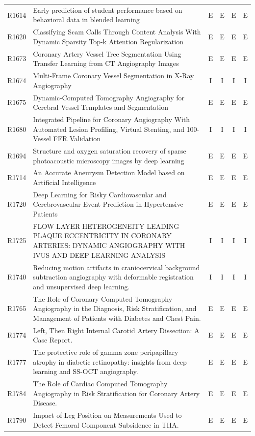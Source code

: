 \begin{longtable}{@{}l p{8.6cm} c c c c@{}}
R1614 & Early prediction of student performance based on behavioral data in blended learning & E & E & E & E \\
R1620 & Classifying Scam Calls Through Content Analysis With Dynamic Sparsity Top-k Attention Regularization & E & E & E & E \\
R1673 & Coronary Artery Vessel Tree Segmentation Using Transfer Learning from CT Angiography Images & E & E & E & E \\
R1674 & Multi-Frame Coronary Vessel Segmentation in X-Ray Angiography & I & I & I & I \\
R1675 & Dynamic-Computed Tomography Angiography for Cerebral Vessel Templates and Segmentation & E & E & E & E \\
R1680 & Integrated Pipeline for Coronary Angiography With Automated Lesion Profiling, Virtual Stenting, and 100-Vessel FFR Validation & I & I & I & I \\
R1694 & Structure and oxygen saturation recovery of sparse photoacoustic microscopy images by deep learning & E & E & E & E \\
R1714 & An Accurate Aneurysm Detection Model based on Artificial Intelligence & E & E & E & E \\
R1720 & Deep Learning for Risky Cardiovascular and Cerebrovascular Event Prediction in Hypertensive Patients & E & E & E & E \\
R1725 & FLOW LAYER HETEROGENEITY LEADING PLAQUE ECCENTRICITY IN CORONARY ARTERIES: DYNAMIC ANGIOGRAPHY WITH IVUS AND DEEP LEARNING ANALYSIS & I & I & I & I \\
R1740 & Reducing motion artifacts in craniocervical background subtraction angiography with deformable registration and unsupervised deep learning. & I & I & I & I \\
R1765 & The Role of Coronary Computed Tomography Angiography in the Diagnosis, Risk Stratification, and Management of Patients with Diabetes and Chest Pain. & E & E & E & E \\
R1774 & Left, Then Right Internal Carotid Artery Dissection: A Case Report. & E & E & E & E \\
R1777 & The protective role of gamma zone peripapillary atrophy in diabetic retinopathy: insights from deep learning and SS-OCT angiography. & E & E & E & E \\
R1784 & The Role of Cardiac Computed Tomography Angiography in Risk Stratification for Coronary Artery Disease. & E & E & E & E \\
R1790 & Impact of Leg Position on Measurements Used to Detect Femoral Component Subsidence in THA. & E & E & E & E \\

\end{longtable}
